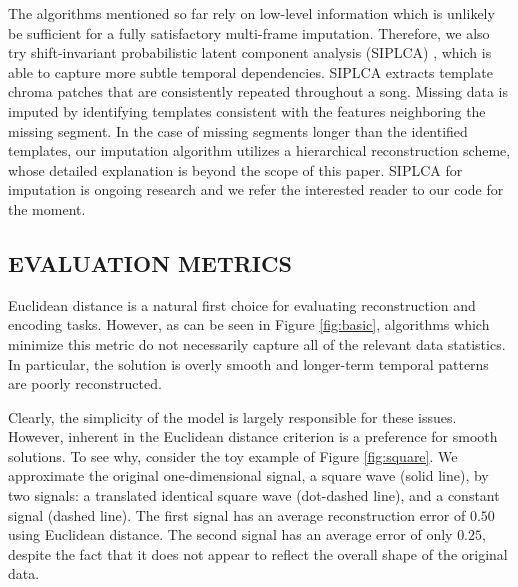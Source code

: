 \documentclass{article}
\newcommand{\FIXME}[2][FIXME]{}%
\begin{document}
The algorithms mentioned so far rely on low-level information which is
unlikely be sufficient for a fully satisfactory multi-frame imputation.
Therefore, we also try shift-invariant probabilistic latent
component analysis (SIPLCA) \cite{Smaragdis2009,Weiss2010}, which is
able to capture more subtle temporal dependencies.
SIPLCA extracts template chroma patches that are
consistently repeated throughout a song.  Missing data is imputed by
identifying templates consistent with the features neighboring the
missing segment.  In the case of missing segments longer than the
identified templates, our imputation algorithm utilizes a hierarchical
reconstruction scheme, whose detailed explanation is beyond the scope
of this paper.  SIPLCA for imputation is ongoing research and we refer
the interested reader to our code for the moment.


\subsection{EVALUATION METRICS}
\label{ssec:measures}
Euclidean distance is a natural first choice for evaluating
reconstruction and encoding tasks. However, as can be seen in Figure
\ref{fig:basic}, algorithms which minimize this metric do not
necessarily capture all of the relevant data statistics.  In
particular, the solution is overly smooth and longer-term temporal
patterns are poorly reconstructed.

Clearly, the simplicity of the model is largely responsible for these
issues.  However, inherent in the Euclidean distance criterion is a
preference for smooth solutions.
To see why, consider the toy example of Figure \ref{fig:square}. We
approximate the original one-dimensional signal, a square wave (solid
line), by two signals: a translated identical square wave (dot-dashed
line), and a constant signal (dashed line). The first signal has an
average reconstruction error of $0.50$ using Euclidean distance. The
second signal has an average error of only $0.25$, despite the fact
that it does not appear to reflect the overall shape of the original
data.
\end{document}
